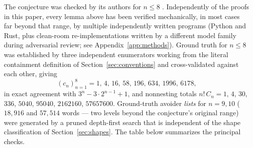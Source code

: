 \documentclass[11pt]{article}
\theoremstyle{definition}
\theoremstyle{remark}
\newcommand{\Cat}{C}
\begin{document}
The conjecture was checked by its authors for $n\le8$
\cite[Table~4]{ElizaldeLuo}. Independently of the proofs in this paper,
every lemma above has been verified mechanically, in most cases far beyond
that range, by multiple independently written programs (Python and Rust,
plus clean-room re-implementations written by a different model family
during adversarial review; see Appendix~\ref{app:methods}). Ground truth
for $n\le8$ was established by three independent enumerators working from
the literal containment definition of Section~\ref{sec:conventions} and
cross-validated against each other, giving
\[
 (c_n)_{n=1}^{8} = 1,\,4,\,16,\,58,\,196,\,634,\,1996,\,6178,
\]
in exact agreement with $3^n-3\cdot2^{n-1}+1$, and nonnesting totals
$n!\,\Cat_n=1$, $4$, $30$, $336$, $5040$, $95040$, $2162160$, $57657600$.
Ground-truth avoider
\emph{lists} for $n=9,10$ ($18{,}916$ and $57{,}514$ words --- two levels
beyond the conjecture's original range) were generated by a pruned
depth-first search that is independent of the shape classification of
Section~\ref{sec:shapes}. The table below summarizes the principal checks.
\end{document}

